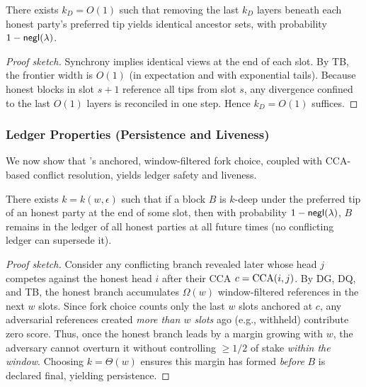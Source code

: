 \begin{theorem}
\label{thm:ideal-DCP}
There exists $k_D=O(1)$ such that removing the last $k_D$ layers beneath each honest party's preferred tip yields identical ancestor sets, with probability $1-\mathsf{negl}(\lambda)$.
\end{theorem}
\begin{proof}[Proof sketch]
Synchrony implies identical views at the end of each slot. By TB, the frontier width is $O(1)$ (in expectation and with exponential tails). Because honest blocks in slot $s{+}1$ reference all tips from slot $s$, any divergence confined to the last $O(1)$ layers is reconciled in one step. Hence $k_D=O(1)$ suffices.
\end{proof}

\subsubsection{Ledger Properties (Persistence and Liveness)}
\label{subsec:ideal-ledger-props}
We now show that \ProjIdeal's anchored, window-filtered fork choice, coupled with CCA-based conflict resolution, yields ledger safety and liveness.

\begin{theorem}
\label{thm:ideal-safety}
There exists $k=k(w,\epsilon)$ such that if a block $B$ is $k$-deep under the preferred tip of an honest party at the end of some slot, then with probability $1-\mathsf{negl}(\lambda)$, $B$ remains in the ledger of all honest parties at all future times (no conflicting ledger can supersede it).
\end{theorem}
\begin{proof}[Proof sketch]
Consider any conflicting branch revealed later whose head $j$ competes against the honest head $i$ after their CCA $c=\mathrm{CCA}(i,j)$. By DG, DQ, and TB, the honest branch accumulates $\Omega(w)$ window-filtered references in the next $w$ slots. Since fork choice counts only the last $w$ slots anchored at $c$, any adversarial references created \emph{more than $w$ slots} ago (e.g., withheld) contribute zero score. Thus, once the honest branch leads by a margin growing with $w$, the adversary cannot overturn it without controlling $\ge 1/2$ of stake \emph{within the window}. Choosing $k=\Theta(w)$ ensures this margin has formed \emph{before} $B$ is declared final, yielding persistence.
\end{proof}

